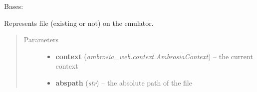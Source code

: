 \documentclass[letterpaper,10pt,english]{sphinxmanual}
\begin{document}
\begin{fulllineitems}
\label{ambrosia.model:ambrosia.model.entities.File}
Bases: {\hyperref[ambrosia.model:ambrosia.model.Entity]{}}

Represents file (existing or not) on the emulator.
\begin{quote}\begin{description}
\item[{Parameters}] \leavevmode\begin{itemize}
\item {} 
\textbf{context} (\emph{ambrosia\_web.context.AmbrosiaContext}) -- the current context

\item {} 
\textbf{abspath} (\emph{str}) -- the absolute path of the file

\end{itemize}

\end{description}\end{quote}

\begin{fulllineitems}
\label{ambrosia.model:ambrosia.model.entities.File.find}
\end{fulllineitems}


\begin{fulllineitems}
\label{ambrosia.model:ambrosia.model.entities.File.get_serializeable_properties}
\end{fulllineitems}


\begin{fulllineitems}
\label{ambrosia.model:ambrosia.model.entities.File.matches_entity}
\end{fulllineitems}



\end{fulllineitems}
\end{document}
